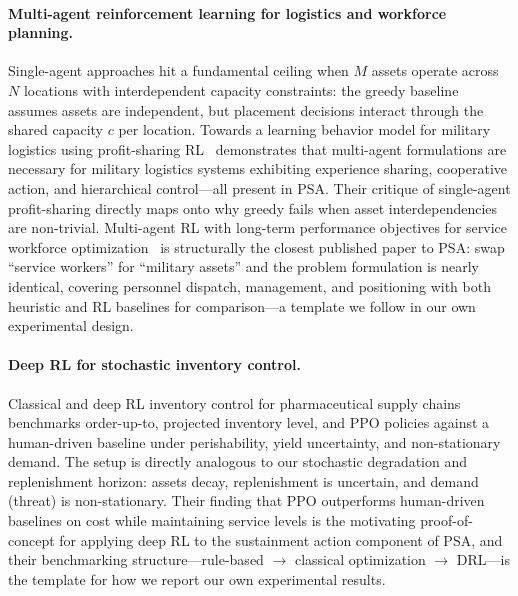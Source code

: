 \documentclass[11pt]{article}
\begin{document}
\paragraph{Multi-agent reinforcement learning for logistics and workforce planning.}
Single-agent approaches hit a fundamental ceiling when $M$ assets operate
across $N$ locations with interdependent capacity constraints: the greedy
baseline assumes assets are independent, but placement decisions interact
through the shared capacity $c$ per location. Towards a learning behavior
model for military logistics using profit-sharing
RL~\cite{ps_rl_military_logistics} demonstrates that multi-agent
formulations are necessary for military logistics systems exhibiting
experience sharing, cooperative action, and hierarchical control---all
present in PSA. Their critique of single-agent profit-sharing directly
maps onto why greedy fails when asset interdependencies are non-trivial.
Multi-agent RL with long-term performance objectives for service workforce
optimization~\cite{marl_workforce} is structurally the closest published
paper to PSA: swap ``service workers'' for ``military assets'' and the
problem formulation is nearly identical, covering personnel dispatch,
management, and positioning with both heuristic and RL baselines for
comparison---a template we follow in our own experimental design.

\paragraph{Deep RL for stochastic inventory control.}
Classical and deep RL inventory control for pharmaceutical supply
chains~\cite{drl_pharma_supply} benchmarks order-up-to, projected
inventory level, and PPO policies against a human-driven baseline under
perishability, yield uncertainty, and non-stationary demand. The setup is
directly analogous to our stochastic degradation and replenishment horizon:
assets decay, replenishment is uncertain, and demand (threat) is
non-stationary. Their finding that PPO outperforms human-driven baselines
on cost while maintaining service levels is the motivating proof-of-concept
for applying deep RL to the sustainment action component of PSA, and their
benchmarking structure---rule-based $\to$ classical optimization $\to$
DRL---is the template for how we report our own experimental results.

\end{document}
